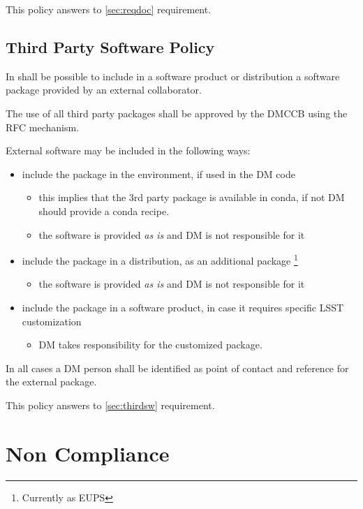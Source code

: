 This policy answers to \ref{sec:reqdoc} requirement.


\subsection{Third Party Software Policy} \label{sec:thirdpolicy}

In shall be possible to include in a software product or distribution a software package provided by an external collaborator.

The use of all third party packages shall be approved by the DMCCB using the RFC mechanism.

External software may be included in the following ways:

\begin{itemize}
\item include the package in the environment, if used in the DM code
    \begin{itemize}
    \item this implies that the 3rd party package is available in conda, if not DM should provide a conda recipe.
    \item the software is provided \textit{as is} and DM is not responsible for it
    \end{itemize}
\item include the package in a distribution, as an additional  package \footnote{Currently as EUPS}
    \begin{itemize}
    \item the software is provided \textit{as is} and DM is not responsible for it
    \end{itemize}
\item include the package in a software product, in case it requires specific LSST customization
    \begin{itemize}
    \item DM takes responsibility for the customized package.
    \end{itemize}
\end{itemize}

In all cases a DM person shall be identified as point of contact and reference for the external package.

This policy answers to \ref{sec:thirdsw} requirement.


\newpage
\section{Non Compliance} \label{sec:noncompliance}

